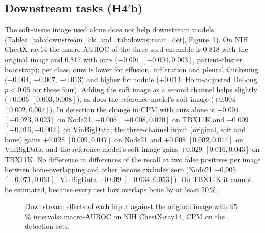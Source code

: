 \subsection{Downstream tasks (\texorpdfstring{H4$'$b}{H4'b})}
The soft-tissue image used alone does not help downstream models (Tables~\ref{tab:downstream_cls} and~\ref{tab:downstream_det},
Figure~\ref{fig:downstream_forest}). On NIH ChestX-ray14 the macro-AUROC of the three-seed ensemble is 0.818 with the original image and
0.817 with ours ($-0.001$ $[-0.004,0.003]$, patient-cluster bootstrap); per class, ours is lower for effusion, infiltration and pleural
thickening ($-0.004$, $-0.007$, $-0.013$) and higher for nodule ($+0.011$; Holm-adjusted DeLong $p<0.05$ for these four). Adding the soft image
as a second channel helps slightly ($+0.006$ $[0.003,0.008]$), as does the reference model's soft image ($+0.004$ $[0.002,0.007]$). In
detection the change in CPM with ours alone is $+0.001$ $[-0.023,0.023]$ on Node21, $+0.006$ $[-0.008,0.020]$ on TBX11K and $-0.009$
$[-0.016,-0.002]$ on VinBigData; the three-channel input (original, soft and bone) gains $+0.028$ $[0.009,0.047]$ on Node21 and $+0.008$
$[0.002,0.014]$ on VinBigData, and the reference model's soft image gains $+0.029$ $[0.016,0.043]$ on TBX11K. No difference in differences of
the recall at two false positives per image between bone-overlapping and other lesions excludes zero (Node21 $-0.005$ $[-0.071,0.061]$,
VinBigData $+0.009$ $[-0.034,0.053]$). On TBX11K it cannot be estimated, because every test box overlaps bone by at least 20\,\%.
\begin{table}[htbp]
\centering\small
\caption{Downstream classification on NIH ChestX-ray14: macro-AUROC of the three-seed ensemble, per-seed mean $\pm$ SD and the difference to
the original image (patient-cluster bootstrap).}
\label{tab:downstream_cls}
\end{table}
\begin{table}[htbp]
\centering\small
\caption{Downstream detection on Node21, TBX11K and VinBigData: CPM and mAP@50 (mean $\pm$ SD over three seeds), differences to the original
image and the difference in differences (DiD) of recall at two false positives per image (image bootstrap).}
\label{tab:downstream_det}
\end{table}
\begin{figure}[htbp]
\centering
{}
\caption{Downstream effects of each input against the original image with 95\,\% intervals: macro-AUROC on NIH ChestX-ray14, CPM on the
detection sets.}
\label{fig:downstream_forest}
\end{figure}

